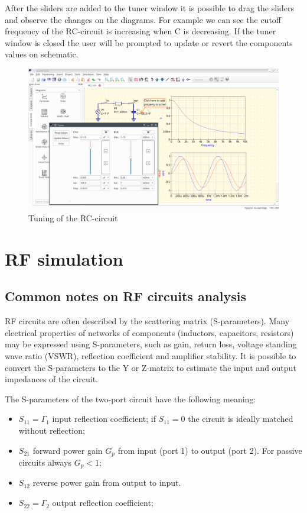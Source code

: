 \documentclass[a4paper,12pt]{article}
\begin{document}
After the sliders are added to the tuner window it is possible to drag the sliders and observe the changes on the diagrams. For example we can see the cutoff frequency of the RC-circuit is increasing when C is decreasing. If the tuner window is closed the user will be prompted to update or revert the components values on schematic. 

    \begin{figure}[!ht]
    \begin{center}
        \includegraphics[width=\textwidth]{img/tuner_rc.png}
    \end{center}
    \caption{Tuning of the RC-circuit} \label{fig:tuner_rc}
    \end{figure}
    
    
\section{RF simulation}

\subsection{Common notes on RF circuits analysis}

RF circuits are often described by the scattering matrix (S-parameters). Many electrical properties of networks of components (inductors, capacitors, resistors) may be expressed using S-parameters, such as gain, return loss, voltage standing wave ratio (VSWR), reflection coefficient and amplifier stability. It is possible to convert the S-parameters to the Y or Z-matrix to estimate the input and output impedances of the circuit. 

The S-parameters of the two-port circuit have the following meaning:

\begin{itemize}
 \item $S_{11}=\Gamma_1$ input reflection coefficient; if $S_{11}=0$ the circuit is ideally matched without reflection;
 \item $S_{21}$ forward power gain $G_p$ from input (port 1) to output (port 2). For passive circuits always $G_p<1$; 
 \item $S_{12}$ reverse power gain from output to input.
 \item $S_{22}=\Gamma_2$ output reflection coefficient;
\end{itemize}
\end{document}

